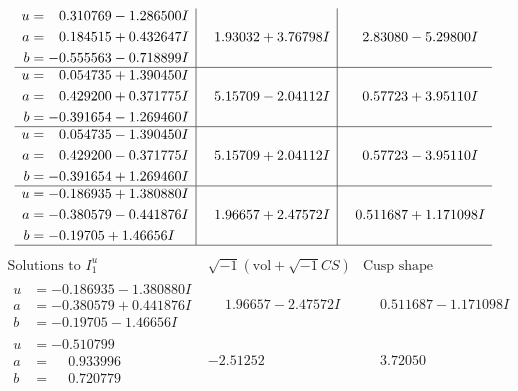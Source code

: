 \documentclass[1p]{elsarticle_modified}
\theoremstyle{definition}
\newcommand{\I}{\sqrt{-1}}
\begin{document}
$$\begin{array}{c|c|c}
\begin{aligned}
u &= \phantom{-}0.310769 - 1.286500 I \\
a &= \phantom{-}0.184515 + 0.432647 I \\
b &= -0.555563 - 0.718899 I\end{aligned}
 & \phantom{-}1.93032 + 3.76798 I & \phantom{-}2.83080 - 5.29800 I \\ \hline\begin{aligned}
u &= \phantom{-}0.054735 + 1.390450 I \\
a &= \phantom{-}0.429200 + 0.371775 I \\
b &= -0.391654 - 1.269460 I\end{aligned}
 & \phantom{-}5.15709 - 2.04112 I & \phantom{-}0.57723 + 3.95110 I \\ \hline\begin{aligned}
u &= \phantom{-}0.054735 - 1.390450 I \\
a &= \phantom{-}0.429200 - 0.371775 I \\
b &= -0.391654 + 1.269460 I\end{aligned}
 & \phantom{-}5.15709 + 2.04112 I & \phantom{-}0.57723 - 3.95110 I \\ \hline\begin{aligned}
u &= -0.186935 + 1.380880 I \\
a &= -0.380579 - 0.441876 I \\
b &= -0.19705 + 1.46656 I\end{aligned}
 & \phantom{-}1.96657 + 2.47572 I & \phantom{-}0.511687 + 1.171098 I\\
 \hline 
 \end{array}$$\newpage$$\begin{array}{c|c|c}  
\text{Solutions to }I^u_{1}& \I (\text{vol} + \sqrt{-1}CS) & \text{Cusp shape}\\
 \hline 
\begin{aligned}
u &= -0.186935 - 1.380880 I \\
a &= -0.380579 + 0.441876 I \\
b &= -0.19705 - 1.46656 I\end{aligned}
 & \phantom{-}1.96657 - 2.47572 I & \phantom{-}0.511687 - 1.171098 I \\ \hline\begin{aligned}
u &= -0.510799\phantom{ +0.000000I} \\
a &= \phantom{-}0.933996\phantom{ +0.000000I} \\
b &= \phantom{-}0.720779\phantom{ +0.000000I}\end{aligned}
 & -2.51252\phantom{ +0.000000I} & \phantom{-}3.72050\phantom{ +0.000000I} \\ \hline\begin{aligned}

\end{aligned}
\end{array}$$
\end{document}
